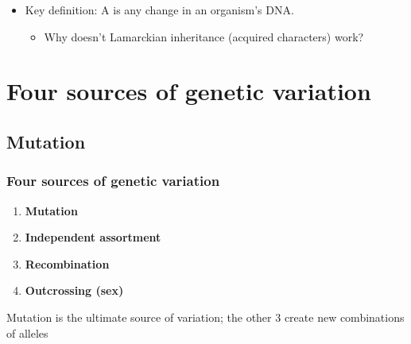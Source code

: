 \begin{frame}[t]
    \begin{adjustwidth}{-1.5em}{-1.5em}
        \begin{itemize}
            \item Key definition: A  is any change in an
                organism's DNA.

                \begin{itemize}
                    \item Why doesn't Lamarckian inheritance (acquired
                        characters) work?


                \end{itemize}

        \end{itemize}
    \end{adjustwidth}
\end{frame}

\section{Four sources of genetic variation}

\subsection{Mutation}

\begin{frame}[t]
    \frametitle{Four sources of genetic variation}
    \begin{enumerate}
        \item \textbf{Mutation}
        \item \textbf{Independent assortment}
        \item \textbf{Recombination}
        \item \textbf{Outcrossing (sex)}
    \end{enumerate}

    Mutation is the ultimate source of variation; the other 3 create new
    combinations of alleles
\end{frame}

